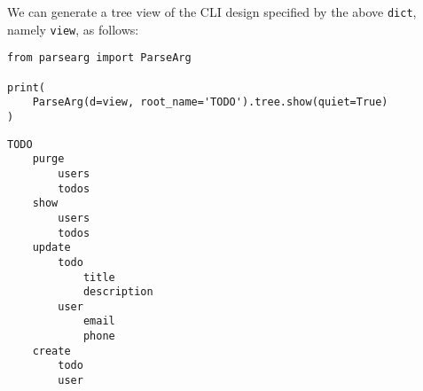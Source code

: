 \documentclass[10pt]{amsart}
\numberwithin{equation}{section}
\begin{document}
We can generate a tree view of the CLI design specified by the above \texttt{dict},
namely \texttt{view}, as follows:
\begin{verbatim}
from parsearg import ParseArg

print(
    ParseArg(d=view, root_name='TODO').tree.show(quiet=True)
)
\end{verbatim}

\begin{verbatim}
TODO
    purge
        users
        todos
    show
        users
        todos
    update
        todo
            title
            description
        user
            email
            phone
    create
        todo
        user


\end{verbatim}

\newpage
\end{document}
